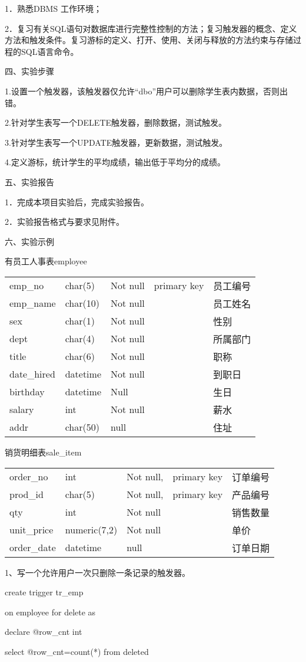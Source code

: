 \documentclass[
]{article}
\begin{document}
1．熟悉DBMS 工作环境；

2．复习有关SQL语句对数据库进行完整性控制的方法；复习触发器的概念、定义方法和触发条件。复习游标的定义、打开、使用、关闭与释放的方法约束与存储过程的SQL语言命令。

四、实验步骤

1.设置一个触发器，该触发器仅允许``dbo''用户可以删除学生表内数据，否则出错。

2.针对学生表写一个DELETE触发器，删除数据，测试触发。

3.针对学生表写一个UPDATE触发器，更新数据，测试触发。

4.定义游标，统计学生的平均成绩，输出低于平均分的成绩。

五、实验报告

1．完成本项目实验后，完成实验报告。

2．实验报告格式与要求见附件。

六、实验示例

有员工人事表employee

\begin{longtable}[]{@{}lllll@{}}
\toprule
\endhead
emp\_no & char(5) & Not null & primary key & 员工编号\tabularnewline
emp\_name & char(10) & Not null & & 员工姓名\tabularnewline
sex & char(1) & Not null & & 性别\tabularnewline
dept & char(4) & Not null & & 所属部门\tabularnewline
title & char(6) & Not null & & 职称\tabularnewline
date\_hired & datetime & Not null & & 到职日\tabularnewline
birthday & datetime & Null & & 生日\tabularnewline
salary & int & Not null & & 薪水\tabularnewline
addr & char(50) & null & & 住址\tabularnewline
\bottomrule
\end{longtable}

销货明细表sale\_item

\begin{longtable}[]{@{}lllll@{}}
\toprule
\endhead
order\_no & int & Not null, & primary key & 订单编号\tabularnewline
prod\_id & char(5) & Not null, & primary key & 产品编号\tabularnewline
qty & int & Not null & & 销售数量\tabularnewline
unit\_price & numeric(7,2) & Not null & & 单价\tabularnewline
order\_date & datetime & null & & 订单日期\tabularnewline
\bottomrule
\end{longtable}

1、写一个允许用户一次只删除一条记录的触发器。

create trigger tr\_emp

on employee for delete as

declare @row\_cnt int

select @row\_cnt=count(*) from deleted
\end{document}
